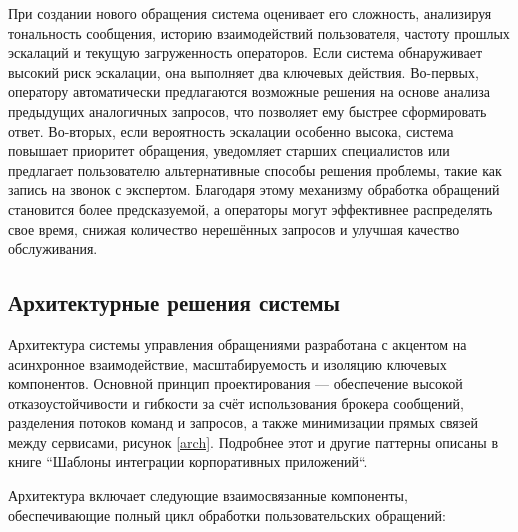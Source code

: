 При создании нового обращения система оценивает его сложность, анализируя тональность сообщения, историю взаимодействий пользователя, частоту прошлых эскалаций и текущую загруженность операторов. Если система обнаруживает высокий риск эскалации, она выполняет два ключевых действия. Во-первых, оператору автоматически предлагаются возможные решения на основе анализа предыдущих аналогичных запросов, что позволяет ему быстрее сформировать ответ. Во-вторых, если вероятность эскалации особенно высока, система повышает приоритет обращения, уведомляет старших специалистов или предлагает пользователю альтернативные способы решения проблемы, такие как запись на звонок с экспертом. Благодаря этому механизму обработка обращений становится более предсказуемой, а операторы могут эффективнее распределять свое время, снижая количество нерешённых запросов и улучшая качество обслуживания.

\subsection{Архитектурные решения системы}

Архитектура системы управления обращениями разработана с акцентом на асинхронное взаимодействие, масштабируемость и изоляцию ключевых компонентов. Основной принцип проектирования — обеспечение высокой отказоустойчивости и гибкости за счёт использования брокера сообщений, разделения потоков команд и запросов, а также минимизации прямых связей между сервисами, рисунок \ref{arch}. Подробнее этот и другие паттерны описаны в книге ``Шаблоны интеграции корпоративных приложений``\cite{hohpe2003enterprise}.


Архитектура включает следующие взаимосвязанные компоненты, обеспечивающие полный цикл обработки пользовательских обращений:

